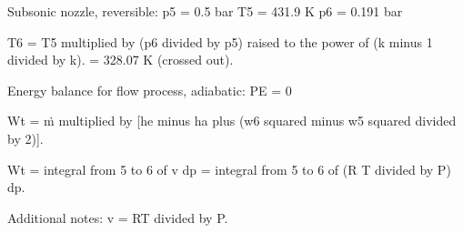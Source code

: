 Subsonic nozzle, reversible:  
p5 = 0.5 bar  
T5 = 431.9 K  
p6 = 0.191 bar  

T6 = T5 multiplied by (p6 divided by p5) raised to the power of (k minus 1 divided by k).  
= 328.07 K (crossed out).  

Energy balance for flow process, adiabatic:  
PE = 0  

Wt = ṁ multiplied by [he minus ha plus (w6 squared minus w5 squared divided by 2)].  

Wt = integral from 5 to 6 of v dp = integral from 5 to 6 of (R T divided by P) dp.  

Additional notes:  
v = RT divided by P.
